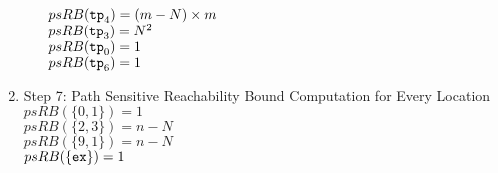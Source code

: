 \begin{enumerate}
\begin{itemize}
{    $psRB(\mathtt{tp}_4) = (m - N) \times m$ \\}
    $psRB(\mathtt{tp}_3) = N^2$ \\
    $psRB(\mathtt{tp}_0) = 1$ \\
    $psRB(\mathtt{tp}_6) = 1$ 
\end{itemize}
\item Step 7: Path Sensitive Reachability Bound Computation for Every Location
\\
$psRB(\{0, 1\}) = 1$ \\
$psRB(\{2, 3\}) = n - N$ \\
$psRB(\{9, 1\}) = n - N$ \\
$psRB(\{\mathtt{ex}\}) = 1$ 
\end{enumerate}